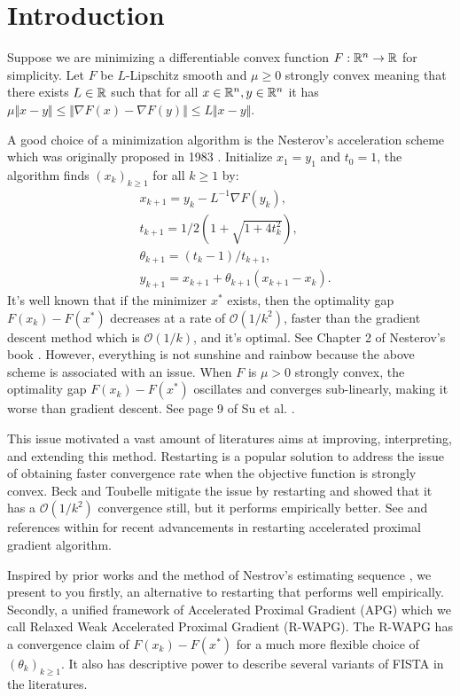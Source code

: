\documentclass[12pt]{article}
\begin{document}
\section{Introduction}
    Suppose we are minimizing a differentiable convex function $F: \mathbb R^n \rightarrow \mathbb R$ for simplicity. 
    Let $F$ be $L$-Lipschitz smooth and $\mu \ge 0$ strongly convex meaning that there exists $L \in \mathbb R$ such that for all $x \in \mathbb R^n, y\in \mathbb R^n$ it has $\mu\Vert x - y\Vert\le \Vert \nabla F(x) - \nabla F(y)\Vert \le L \Vert x - y \Vert$. 
    \par 
    A good choice of a minimization algorithm is the Nesterov's acceleration scheme which was originally proposed in 1983 \cite{nesterov_method_1983}. 
    Initialize $x_1 = y_1$ and $t_0 = 1$, the algorithm finds $(x_k)_{k \ge 1}$ for all $k \ge 1$ by: 
    \begin{align}
        & x_{k + 1} = y_k - L^{-1}\nabla F(y_k), 
        \\
        & t_{k + 1} = 1/2\left(1 + \sqrt{1 + 4t_{k}^2}\right), 
        \\
        & \theta_{k + 1} = (t_{k} - 1)/t_{k + 1}, 
        \\
        & y_{k + 1} = x_{k + 1} + \theta_{k + 1}(x_{k + 1} - x_k). 
    \end{align}\label{eqn:example_algorithm}
    It's well known that if the minimizer $x^*$ exists, then the optimality gap $F(x_k) - F(x^*)$ decreases at a rate of $\mathcal O(1/k^2)$, faster than the gradient descent method which is $\mathcal O(1/k)$, and it's optimal.
    See Chapter 2 of Nesterov's book \cite{nesterov_lectures_2018}. 
    However, everything is not sunshine and rainbow because the above scheme is associated with an issue. 
    When $F$ is $\mu > 0$ strongly convex, the optimality gap $F(x_k) - F(x^*)$ oscillates and converges sub-linearly, making it worse than gradient descent. See page 9 of Su et al. \cite{su_differential_2016}. 
    \par
    This issue motivated a vast amount of literatures aims at improving, interpreting, and extending this method. 
    Restarting is a popular solution to address the issue of obtaining faster convergence rate when the objective function is strongly convex. 
    Beck and Toubelle \cite{beck_fast_2009} mitigate the issue by restarting and showed that it has a $\mathcal O(1/k^2)$ convergence still, but it performs empirically better. 
    See \cite{necoara_linear_2019}\cite{aujol_parameter-free_2024} and references within for recent advancements in restarting accelerated proximal gradient algorithm. 
    \par
    Inspired by prior works and the method of Nestrov's estimating sequence \cite{nesterov_lectures_2018}, we present to you firstly, an alternative to restarting that performs well empirically. 
    Secondly, a unified framework of Accelerated Proximal Gradient (APG) which we call Relaxed Weak Accelerated Proximal Gradient (R-WAPG). 
    The R-WAPG has a convergence claim of $F(x_k)- F(x^*)$ for a much more flexible choice of $(\theta_k)_{k \ge 1}$. 
    It also has descriptive power to describe several variants of FISTA in the literatures.  
\end{document}
